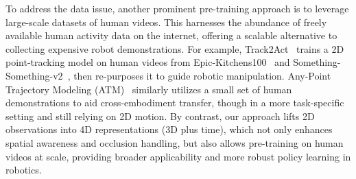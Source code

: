 To address the data issue, another prominent pre-training approach is to leverage large-scale datasets of human videos. This harnesses the abundance of freely available human activity data on the internet, offering a scalable alternative to collecting expensive robot demonstrations. For example, Track2Act~\cite{bharadhwajTrack2ActPredictingPoint2024} trains a 2D point-tracking model on human videos from Epic-Kitchens100~\cite{Damen2018EPICKITCHENS} and Something-Something-v2~\cite{goyal2017something}, then re-purposes it to guide robotic manipulation. Any-Point Trajectory Modeling (ATM)~\cite{wenAnypointTrajectoryModeling2024} similarly utilizes a small set of human demonstrations to aid cross-embodiment transfer, though in a more task-specific setting and still relying on 2D motion. By contrast, our approach lifts 2D observations into 4D representations (3D plus time), which not only enhances spatial awareness and occlusion handling, but also allows pre-training on human videos at scale, providing broader applicability and more robust policy learning in robotics.


